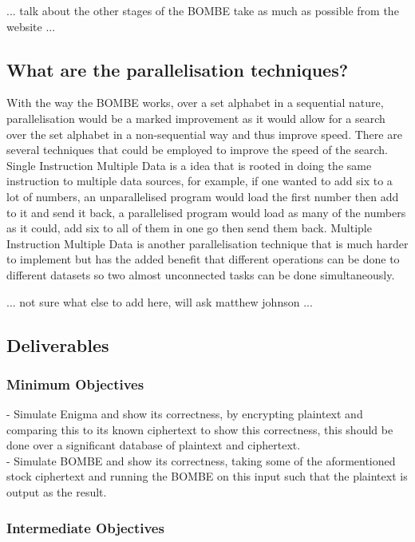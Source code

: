 \documentclass[12pt,a4paper]{article}
\begin{document}
...
talk about the other stages of the BOMBE
take as much as possible from the website
...

\subsection{What are the parallelisation techniques?}

With the way the BOMBE works, over a set alphabet in a sequential nature, parallelisation would be a marked improvement as it would allow for a search over the set alphabet in a non-sequential way and thus improve speed. There are several techniques that could be employed to improve the speed of the search. Single Instruction Multiple Data is a idea that is rooted in doing the same instruction to multiple data sources, for example, if one wanted to add six to a lot of numbers, an unparallelised program would load the first number then add to it and send it back, a parallelised program would load as many of the numbers as it could, add six to all of them in one go then send them back. Multiple Instruction Multiple Data is another parallelisation technique that is much harder to implement but has the added benefit that different operations can be done to different datasets so two almost unconnected tasks can be done simultaneously. 

...
not sure what else to add here, will ask matthew johnson
...

\subsection{Deliverables}

\subsubsection{Minimum Objectives}

- Simulate Enigma and show its correctness, by encrypting plaintext and comparing this to its known ciphertext to show this correctness, this should be done over a significant database of plaintext and ciphertext.\\
- Simulate BOMBE and show its correctness, taking some of the aformentioned stock ciphertext and running the BOMBE on this input such that the plaintext is output as the result.

\subsubsection{Intermediate Objectives}
\end{document}
